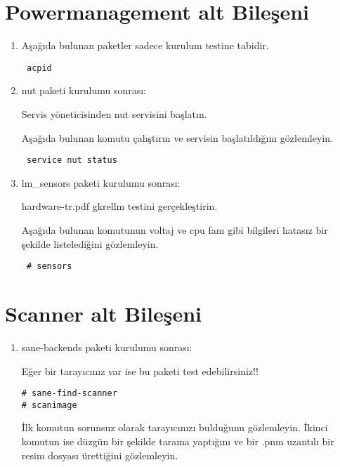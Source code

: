 \documentclass[a4paper,10pt]{article}
\begin{document}
\section{Powermanagement alt Bileşeni}
\begin{enumerate}
\item Aşağıda bulunan paketler sadece kurulum testine tabidir.
\begin{verbatim}
 acpid
\end{verbatim}
\item nut paketi kurulumu sonrası:

Servis yöneticisinden nut servisini başlatın.

Aşağıda bulunan komutu çalıştırın ve servisin başlatıldığını gözlemleyin. 
\begin{verbatim}
 service nut status
\end{verbatim}


 \item lm\_sensors paketi kurulumu sonrası:

hardware-tr.pdf gkrellm testini gerçekleştirin.

Aşağıda bulunan komutunun voltaj ve cpu fanı gibi bilgileri hatasız bir şekilde listelediğini gözlemleyin.
\begin{verbatim}
 # sensors 
\end{verbatim}

\end{enumerate}

\section{Scanner alt Bileşeni}
\begin{enumerate}
\item sane-backends paketi kurulumu sonrası:

Eğer bir tarayıcınız var ise bu paketi test edebilirsiniz!!
\begin{verbatim}
# sane-find-scanner
# scanimage 
\end{verbatim}

İlk komutun sorunsuz olarak tarayıcınızı bulduğunu gözlemleyin.
İkinci komutun ise düzgün bir şekilde tarama yaptığını ve bir .pnm uzantılı bir resim dosyası ürettiğini gözlemleyin.

\end{enumerate}
\end{document}
